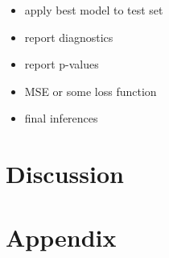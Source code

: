 \documentclass{article}
\begin{document}
\begin{itemize}

\item apply best model to test set
\item report diagnostics
\item report p-values
\item MSE or some loss function
\item final inferences

\end{itemize}

\section{Discussion}\label{Discussion}

\section{Appendix}
\end{document}
